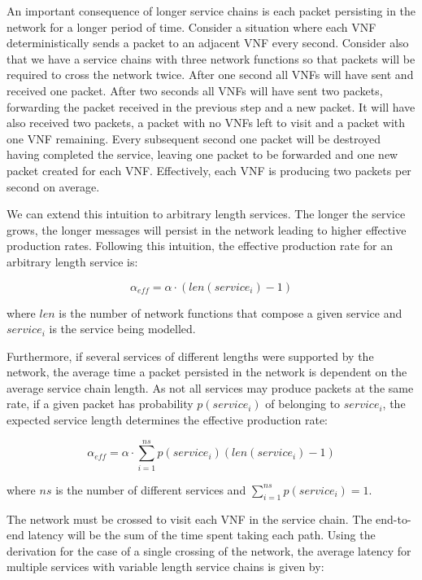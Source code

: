 An important consequence of longer service chains is each packet persisting in the network for a longer period of time. Consider a situation where each VNF deterministically sends a packet to an adjacent VNF every second. Consider also that we have a service chains with three network functions so that packets will be required to cross the network twice. After one second all VNFs will have sent and received one packet. After two seconds all VNFs will have sent two packets, forwarding the packet received in the previous step and a new packet. It will have also received two packets, a packet with no VNFs left to visit and a packet with one VNF remaining. Every subsequent second one packet will be destroyed having completed the service, leaving one packet to be forwarded and one new packet created for each VNF. Effectively, each VNF is producing two packets per second on average.

We can extend this intuition to arbitrary length services. The longer the service grows, the longer messages will persist in the network leading to higher effective production rates. Following this intuition, the effective production rate for an arbitrary length service is:

\begin{equation}
\label{eq:alpha_eff_single}
\alpha_{eff} = \alpha \cdot (len(service_i) - 1)
\end{equation}

where $len$ is the number of network functions that compose a given service and $service_i$ is the service being modelled.

Furthermore, if several services of different lengths were supported by the network, the average time a packet persisted in the network is dependent on the average service chain length. As not all services may produce packets at the same rate, if a given packet has probability $p(service_i)$ of belonging to $service_i$, the expected service length determines the effective production rate:

\begin{equation}
\label{eq:alpha_eff}
\alpha_{eff} = \alpha \cdot \sum_{i=1}^{ns} p(service_i) (len(service_i) - 1)
\end{equation}

where $ns$ is the number of different services and $\sum_{i=1}^{ns} p(service_i) = 1$.

The network must be crossed to visit each VNF in the service chain. The end-to-end latency will be the sum of the time spent taking each path. Using the derivation for the case of a single crossing of the network, the average latency for multiple services with variable length service chains is given by:

